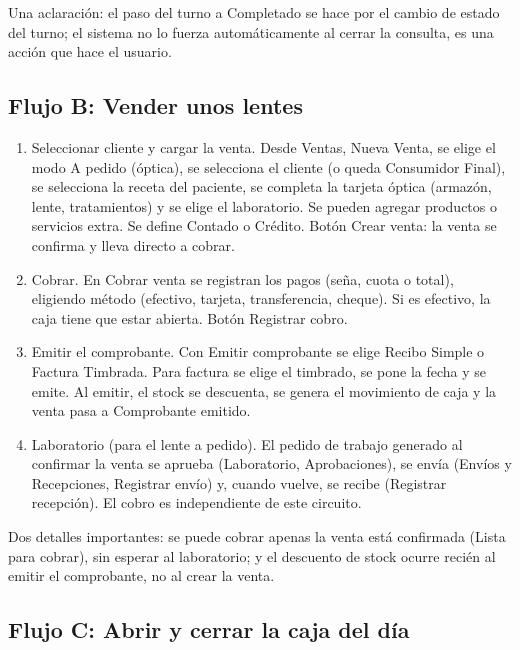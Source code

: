 Una aclaración: el paso del turno a Completado se hace por el cambio de estado del turno; el sistema no lo fuerza automáticamente al cerrar la consulta, es una acción que hace el usuario.

\subsection{Flujo B: Vender unos lentes}
\label{sec:mu-flujo-b}

\begin{enumerate}
  \item Seleccionar cliente y cargar la venta. Desde Ventas, Nueva Venta, se elige el modo A pedido (óptica), se selecciona el cliente (o queda Consumidor Final), se selecciona la receta del paciente, se completa la tarjeta óptica (armazón, lente, tratamientos) y se elige el laboratorio. Se pueden agregar productos o servicios extra. Se define Contado o Crédito. Botón Crear venta: la venta se confirma y lleva directo a cobrar.
  \item Cobrar. En Cobrar venta se registran los pagos (seña, cuota o total), eligiendo método (efectivo, tarjeta, transferencia, cheque). Si es efectivo, la caja tiene que estar abierta. Botón Registrar cobro.
  \item Emitir el comprobante. Con Emitir comprobante se elige Recibo Simple o Factura Timbrada. Para factura se elige el timbrado, se pone la fecha y se emite. Al emitir, el stock se descuenta, se genera el movimiento de caja y la venta pasa a Comprobante emitido.
  \item Laboratorio (para el lente a pedido). El pedido de trabajo generado al confirmar la venta se aprueba (Laboratorio, Aprobaciones), se envía (Envíos y Recepciones, Registrar envío) y, cuando vuelve, se recibe (Registrar recepción). El cobro es independiente de este circuito.
\end{enumerate}

Dos detalles importantes: se puede cobrar apenas la venta está confirmada (Lista para cobrar), sin esperar al laboratorio; y el descuento de stock ocurre recién al emitir el comprobante, no al crear la venta.

\subsection{Flujo C: Abrir y cerrar la caja del día}
\label{sec:mu-flujo-c}

